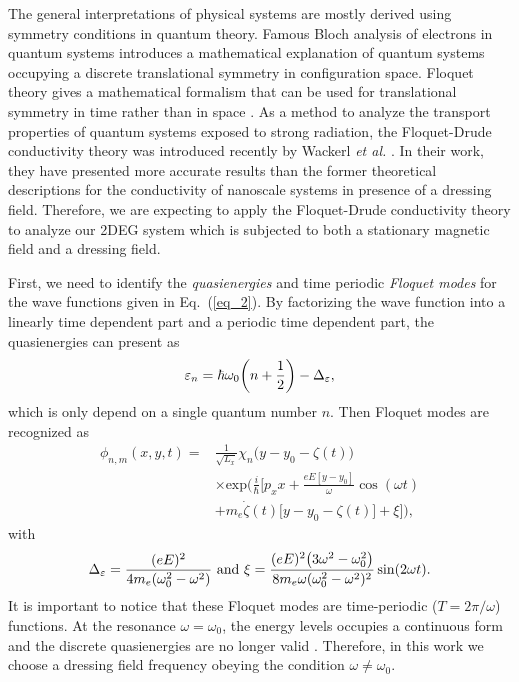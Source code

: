 
The general interpretations of physical systems are mostly derived using symmetry conditions in quantum theory. Famous Bloch analysis of electrons in quantum systems introduces a mathematical explanation of quantum systems occupying a discrete translational symmetry in configuration space. Floquet theory gives a mathematical formalism that can be used for translational symmetry in time rather than in space \cite{floquet83,grifoni98,holthaus15}. As a method to analyze the transport properties of quantum systems exposed to strong radiation, the Floquet-Drude conductivity theory was introduced recently by Wackerl \textit{et al.} \cite{wackerl20}. In their work, they have presented more accurate results than the former theoretical descriptions for the conductivity of nanoscale systems in presence of a dressing field. Therefore, we are expecting to apply the Floquet-Drude conductivity theory to analyze our 2DEG system which is subjected to both a stationary magnetic field and a dressing field.

First, we need to identify the \textit{quasienergies} and time periodic \textit{Floquet modes} \cite{grifoni98} for the wave functions given in Eq.~(\ref{eq_2}). By factorizing the wave function into a linearly time dependent part and a periodic time dependent part, the quasienergies can present as
\begin{equation} \label{eq_6}
  \varepsilon_{n} =
  \hbar \omega_0\qty(n + \frac{1}{2}) - \Delta_{\varepsilon},
\end{equation}
which is only depend on a single quantum number $n$. Then Floquet modes are recognized as
\begin{equation} \label{eq_7}
  \begin{aligned}
    \phi_{n,m}(x,y,t) = &
    \frac{1}{\sqrt{L_x}} \chi_{n}\big(y - y_0 - \zeta(t)\big)\\
    & \times
    \text{exp}\bigg(
     \frac{i}{\hbar}\bigg[
     p_x x +
     \frac{eE[y - y_0]}{\omega}\cos(\omega t) \\
     & +
     m_e\dot{\zeta}(t)\big[y - y_0 -\zeta(t)\big]
     + \xi \bigg]\bigg),
  \end{aligned}
\end{equation}
with
\begin{equation} \label{eq_8}
  \Delta_{\varepsilon} = \frac{(eE)^2}{4m_e(\omega_0^2 - \omega^2)} ~ \text{and} ~
  \xi = \frac{(eE)^2\qty(3\omega^2 - \omega_0^2)}{8m_e\omega(\omega_0^2 - \omega^2)^2} \sin(2\omega t).
\end{equation}
It is important to notice that these Floquet modes are time-periodic ($T=2\pi/\omega$) functions. At the resonance $\omega = \omega_0$, the energy levels occupies a continuous form and the discrete quasienergies are no longer valid \cite{popov70}. Therefore, in this work we choose a dressing field frequency obeying the condition $\omega \neq \omega_0$.

